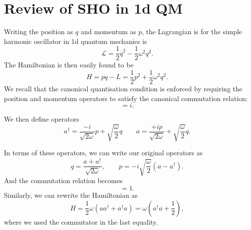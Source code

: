 \section{Review of SHO in 1d QM}%
\label{sec:review_of_sho_in_1d_qm}

Writing the position as $q$ and momentum as $p$, the Lagrangian is for the simple harmonic oscillator in 1d quantum mechanics is
\begin{equation}
  \mathcal{L} = \frac{1}{2}\dot q^2 - \frac{1}{2} \omega^2 q^2.
\end{equation}
The Hamiltonian is then easily found to be
\begin{equation}
  H = p \dot q - L = \frac{1}{2}p^2 + \frac{1}{2} \omega^2 q^2.
\end{equation}
We recall that the canonical quantisation condition is enforced by requiring the position and momentum operators to satisfy the canonical commutation relation:
\begin{equation}
  [q, p] = i.
\end{equation}

We then define operators
\begin{equation}
  a^\dagger = \frac{-i}{\sqrt{2 \omega}} p + \sqrt{\frac{\omega}{2}} q \qquad a = \frac{+ip}{\sqrt{2\omega}} + \sqrt{\frac{\omega}{2}}q.
\end{equation}

In terms of these operators, we can write our original operators as
\begin{equation}
  q = \frac{a + a^\dagger}{\sqrt{2 \omega}}, \qquad p = -i \sqrt{\frac{\omega}{2}} (a - a^\dagger).
\end{equation}
And the commutation relation becomes 
\begin{equation}
  [a, a^\dagger] = 1.
\end{equation}
Similarly, we can rewrite the Hamiltonian as
\begin{equation}
  H = \frac{1}{2} \omega (a a^\dagger + a^\dagger a) = \omega(a^\dagger a + \frac{1}{2}),
\end{equation}
where we used the commutator in the last equality.

